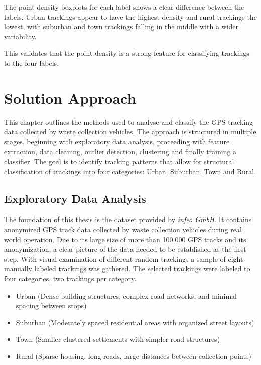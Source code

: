 \documentclass[a4paper,12pt,twoside]{scrreprt}
\begin{document}
The point density boxplots for each label shows a clear difference between the
labels. Urban trackings appear to have the highest density and rural trackings
the lowest, with suburban and town trackings falling in the middle with a wider
variability.

This validates that the point density is a strong feature for classifying
trackings to the four labels.

\section{Solution Approach}
This chapter outlines the methods used to analyse and classify the GPS tracking
data collected by waste collection vehicles.
The approach is structured in multiple stages, beginning with exploratory data
analysis, proceeding with feature extraction, data cleaning, outlier detection,
clustering and finally training a classifier.
The goal is to identify tracking patterns that allow for structural
classification of trackings into four categories: Urban, Suburban, Town and
Rural.

\subsection{Exploratory Data Analysis}

The foundation of this thesis is the dataset provided by \textit{infeo GmbH}.
It contains anonymized GPS track data collected by waste collection vehicles
during real world operation. Due to its large size of more than 100.000 GPS
tracks and its anonymization, a clear picture of the data needed to be
established as the first step.
With visual examination of different random trackings a sample of eight
manually labeled trackings was gathered.
The selected trackings were labeled to four categories, two trackings per
category.

\begin{itemize}
  \item Urban (Dense building structures, complex road networks, and minimal
        spacing between stops)
  \item Suburban (Moderately spaced residential areas with organized street
        layouts)
  \item Town (Smaller clustered settlements with simpler road structures)
  \item Rural (Sparse housing, long roads, large distances between collection
        points)
\end{itemize}
\end{document}

